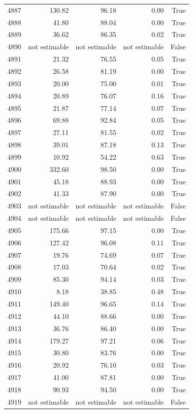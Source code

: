 \begin{longtable}{rrrrr}
4887 & 130.82 & 96.18 & 0.00 & True \\
4888 & 41.80 & 88.04 & 0.00 & True \\
4889 & 36.62 & 86.35 & 0.02 & True \\
4890 & not estimable & not estimable & not estimable & False \\
4891 & 21.32 & 76.55 & 0.05 & True \\
4892 & 26.58 & 81.19 & 0.00 & True \\
4893 & 20.00 & 75.00 & 0.01 & True \\
4894 & 20.89 & 76.07 & 0.16 & True \\
4895 & 21.87 & 77.14 & 0.07 & True \\
4896 & 69.88 & 92.84 & 0.05 & True \\
4897 & 27.11 & 81.55 & 0.02 & True \\
4898 & 39.01 & 87.18 & 0.13 & True \\
4899 & 10.92 & 54.22 & 0.63 & True \\
4900 & 332.60 & 98.50 & 0.00 & True \\
4901 & 45.18 & 88.93 & 0.00 & True \\
4902 & 41.33 & 87.90 & 0.00 & True \\
4903 & not estimable & not estimable & not estimable & False \\
4904 & not estimable & not estimable & not estimable & False \\
4905 & 175.66 & 97.15 & 0.00 & True \\
4906 & 127.42 & 96.08 & 0.11 & True \\
4907 & 19.76 & 74.69 & 0.07 & True \\
4908 & 17.03 & 70.64 & 0.02 & True \\
4909 & 85.30 & 94.14 & 0.03 & True \\
4910 & 8.18 & 38.85 & 0.48 & True \\
4911 & 149.40 & 96.65 & 0.14 & True \\
4912 & 44.10 & 88.66 & 0.00 & True \\
4913 & 36.76 & 86.40 & 0.00 & True \\
4914 & 179.27 & 97.21 & 0.06 & True \\
4915 & 30.80 & 83.76 & 0.00 & True \\
4916 & 20.92 & 76.10 & 0.03 & True \\
4917 & 41.00 & 87.81 & 0.00 & True \\
4918 & 90.93 & 94.50 & 0.00 & True \\
4919 & not estimable & not estimable & not estimable & False \\

\end{longtable}
